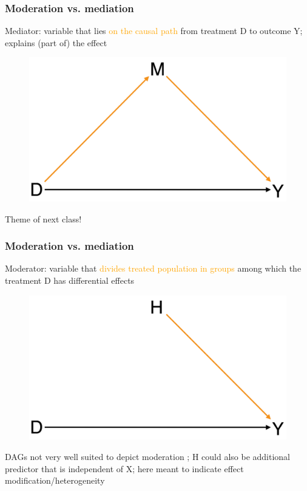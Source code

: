 \documentclass[12pt,english,dvipsnames,aspectratio=169,handout]{beamer}\usepackage[]{graphicx}\usepackage[]{xcolor}
\begin{document}
\begin{frame}
  \frametitle{Moderation vs. mediation}
\footnotesize
Mediator: variable that lies \textcolor{orange}{on the causal path} from treatment D to outcome Y; explains (part of) the effect 


	 \begin{figure} 
    \includegraphics[height=.3\textheight,keepaspectratio=true]{../04-figures/10/01-w10_mediator}
    \end{figure}

Theme of next class!

\vspace{1cm}
\end{frame}


\begin{frame}
  \frametitle{Moderation vs. mediation}
\footnotesize
Moderator: variable that \textcolor{orange}{divides treated population in groups} among which the treatment D has differential effects

	 \begin{figure} 
    \includegraphics[height=.3\textheight,keepaspectratio=true]{../04-figures/10/02-w10_moderator}
    \end{figure}
    
DAGs not very well suited to depict moderation \cite[80]{hernan_causal_2021}; H could also be additional predictor that is independent of X; here meant to indicate effect modification/heterogeneity

\end{frame}
\end{document}
